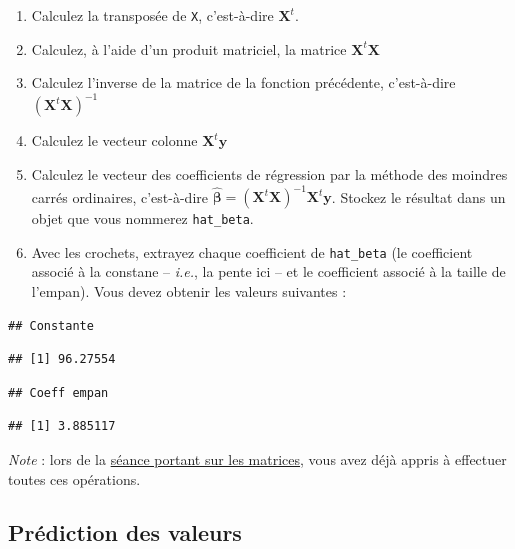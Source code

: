 \documentclass[
  11pt,
]{book}
\providecommand{\tightlist}{%
  \setlength{\itemsep}{0pt}\setlength{\parskip}{0pt}}
\numberwithin{equation}{section}
\numberwithin{countremarque}{section}
\newenvironment{greenbox}{
  \begin{tcolorbox}[breakable, colback=vert,coltext=black,
                  colframe=grisfonce]}
 {\end{tcolorbox}}
\begin{document}
\begin{greenbox}

\begin{enumerate}
\def\labelenumi{\arabic{enumi}.}
\setcounter{enumi}{6}
\tightlist
\item
  Calculez la transposée de \texttt{X}, c'est-à-dire \(\boldsymbol X^t\).
\item
  Calculez, à l'aide d'un produit matriciel, la matrice \(\boldsymbol X^t \boldsymbol X\)
\item
  Calculez l'inverse de la matrice de la fonction précédente, c'est-à-dire \(\left(\boldsymbol X^t \boldsymbol X\right)^{-1}\)
\item
  Calculez le vecteur colonne \(\boldsymbol X^t \boldsymbol y\)
\item
  Calculez le vecteur des coefficients de régression par la méthode des moindres carrés ordinaires, c'est-à-dire \(\hat{\boldsymbol\beta} = \left(\boldsymbol X^t \boldsymbol X\right)^{-1} \boldsymbol X^t \boldsymbol y\). Stockez le résultat dans un objet que vous nommerez \texttt{hat\_beta}.
\item
  Avec les crochets, extrayez chaque coefficient de \texttt{hat\_beta} (le coefficient associé à la constane -- \emph{i.e.}, la pente ici -- et le coefficient associé à la taille de l'empan). Vous devez obtenir les valeurs suivantes :
\end{enumerate}

\begin{lstlisting}
## Constante
\end{lstlisting}

\begin{lstlisting}
## [1] 96.27554
\end{lstlisting}

\begin{lstlisting}
## Coeff empan
\end{lstlisting}

\begin{lstlisting}
## [1] 3.885117
\end{lstlisting}

\emph{Note} : lors de la \protect\hyperlink{matrice}{séance portant sur les matrices}, vous avez déjà appris à effectuer toutes ces opérations.

\end{greenbox}

\hypertarget{pruxe9diction-des-valeurs}{%
\subsection{Prédiction des valeurs}\label{pruxe9diction-des-valeurs}}
\end{document}
